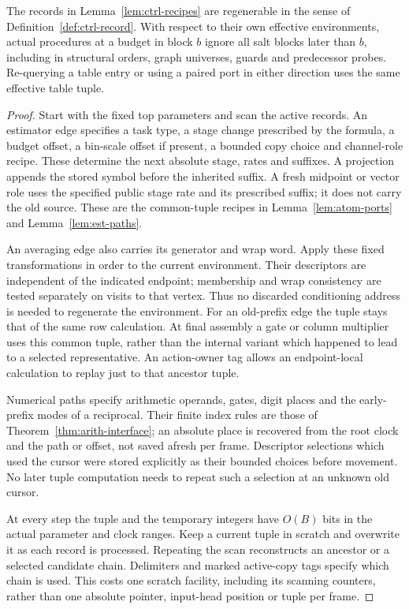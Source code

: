 \begin{lemma}\label{lem:ctrl-replay}
The records in Lemma~\ref{lem:ctrl-recipes} are regenerable in the sense
of Definition~\ref{def:ctrl-record}.  With respect to their own effective
environments, actual procedures at a budget in block $b$ ignore all salt
blocks later than $b$, including in structural orders, graph universes,
guards and predecessor probes.  Re-querying a
table entry or using a paired port in either direction uses the same
effective table tuple.
\end{lemma}

\begin{proof}
Start with the fixed top parameters and scan the active records.  An
estimator edge specifies a task type, a stage change prescribed by the
formula, a budget offset, a bin-scale offset if present, a bounded copy
choice and channel-role recipe.  These determine the next absolute
stage, rates and suffixes.  A projection appends the stored symbol
before the inherited suffix.  A fresh midpoint or vector role uses the
specified public stage rate and its prescribed suffix; it does not
carry the old source.  These are the common-tuple recipes in
Lemma~\ref{lem:atom-ports} and Lemma~\ref{lem:est-paths}.

An averaging edge also carries its generator and wrap word.  Apply
these fixed transformations in order to the current environment.  Their
descriptors are independent of the indicated endpoint; membership and
wrap consistency are tested separately on visits to that vertex.
Thus no discarded conditioning address is needed to regenerate the
environment.  For an old-prefix edge the tuple stays that of the same
row calculation.  At final assembly a gate or column multiplier uses
this common tuple, rather than the internal variant which happened to
lead to a selected representative.  An action-owner tag allows an
endpoint-local calculation to replay just to that ancestor tuple.

Numerical paths specify arithmetic operands, gates, digit places and
the early-prefix modes of a reciprocal.  Their finite index rules are
those of Theorem~\ref{thm:arith-interface}; an absolute place is recovered
from the root clock and the path or offset, not saved afresh per frame.
Descriptor selections which used the cursor were stored explicitly as
their bounded choices before movement.  No later tuple computation
needs to repeat such a selection at an unknown old cursor.

At every step the tuple and the temporary integers have $O(B)$ bits in
the actual parameter and clock ranges.  Keep a current tuple in scratch
and overwrite it as each record is processed.  Repeating the scan
reconstructs an ancestor or a selected candidate chain.  Delimiters and
marked active-copy tags specify which chain is used.  This costs one
scratch facility, including its scanning counters, rather than one
absolute pointer, input-head position or tuple per frame.


\end{proof}
